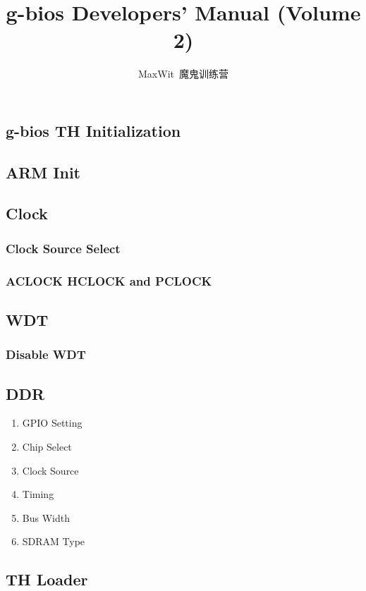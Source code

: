 \documentclass[a4paper,11pt]{book}
\title{g-bios Developers' Manual (Volume 2)}
\author{MaxWit~魔鬼训练营}
\begin{document}
\begin{CJK*}{UTF8}{gbsn}
\CJKtilde
\maketitle
\tableofcontents

\chapter{g-bios TH Initialization}

\section{ARM Init}

\section{Clock}
\subsection{Clock Source Select}
\subsection{ACLOCK HCLOCK and PCLOCK}

\section{WDT}
\subsection{Disable WDT}

\section{DDR}
\begin{enumerate}
\item GPIO Setting
\item Chip Select
\item Clock Source
\item Timing
\item Bus Width
\item SDRAM Type
\end{enumerate}

\section{TH Loader}


\end{CJK*}
\end{document}
